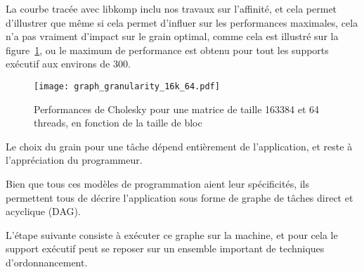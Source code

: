 La courbe tracée avec libkomp inclu nos travaux sur l'affinité, et cela permet d'illustrer que même si cela permet d'influer sur les performances maximales, cela n'a pas vraiment d'impact sur le grain optimal, comme cela est illustré sur la figure~\ref{fig:context:granularity-16k}, ou le maximum de performance est obtenu pour tout les supports exécutif aux environs de 300.


\begin{figure}[ht]
  \centering
  \texttt{[image: graph\_granularity\_16k\_64.pdf]}
  \caption{Performances de Cholesky pour une matrice de taille 163384 et 64 threads, en fonction de la taille de bloc}\label{fig:context:granularity-16k}
\end{figure}


Le choix du grain pour une tâche dépend entièrement de l'application, et reste à l'appréciation du programmeur.

\bigskip

Bien que tous ces modèles de programmation aient leur spécificités, ils permettent tous de décrire l'application sous forme de graphe de tâches direct et acyclique (DAG).

L'étape suivante consiste à exécuter ce graphe sur la machine, et pour cela le support exécutif peut se reposer sur un ensemble important de techniques d'ordonnancement. 


